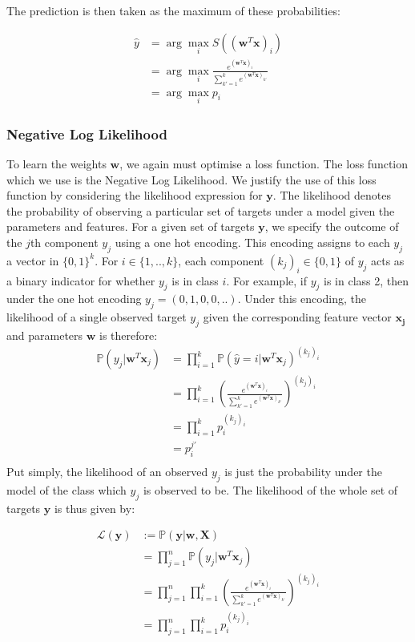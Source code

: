 The prediction is then taken as the maximum of these probabilities:

\begin{align}
   \hat{y} &= \arg \max_i S((\mathbf{w}^T\mathbf{x})_i)\\
   &= \arg\max_i \frac{e^{(\mathbf{w}^T\mathbf{x})_i}}{\sum_{k'=1}^{k} e^{(\mathbf{w}^T\mathbf{x})_{k'}}} \\
   &= \arg\max_i p_i
\end{align}

\subsubsection{Negative Log Likelihood}
To learn the weights $\mathbf{w}$, we again must optimise a loss function. The loss function which we use is the Negative Log Likelihood. We justify the use of this loss function by considering the likelihood expression for $\mathbf{y}$. The likelihood denotes the probability of observing a particular set of targets under a model given the parameters and features. For a given set of targets $\mathbf{y}$, we specify the outcome of the $j$th component $y_j$ using a one hot encoding. This encoding assigns to each $y_j$ a vector in $\{0,1\}^k$. For $i\in \{1,..,k\}$, each component $(k_j)_i \in \{0,1\}$  of $y_j$ acts as a binary indicator for whether $y_j$ is in class $i$. For example, if $y_j$ is in class 2, then under the one hot encoding $y_j = (0,1,0,0,..)$. Under this encoding, the likelihood of a single observed target $y_j$  given the corresponding feature vector $\mathbf{x_j}$ and parameters $\mathbf{w}$ is therefore:
\begin{align}
    \mathbb{P}(y_j| \mathbf{w}^T\mathbf{x}_j) &= \prod_{i=1}^{k}  \mathbb{P}(\hat{y} = i | \mathbf{w}^T\mathbf{x}_j)^{(k_j)_i} \\
    &=\prod_{i=1}^{k}  \left(\frac{e^{(\mathbf{w}^T\mathbf{x})_i}}{\sum_{k'=1}^{k} e^{(\mathbf{w}^T\mathbf{x})_{k'}}}\right)^{(k_j)_i} \\
    &=\prod_{i=1}^{k}  p_i^{(k_j)_i} \\
    &= p_i^{j'} \tag{where $j'$ is the index where $(k_j)_i = 1$} \\
\end{align}
Put simply, the likelihood of an observed $y_j$ is just the probability under the model of the class which $y_j$ is observed to be. The likelihood of the whole set of targets $\mathbf{y}$ is thus given by:

\begin{align}
\mathcal{L}(\mathbf{y}) &:=  \mathbb{P}(\mathbf{y}| \mathbf{w}, \mathbf{X}) \\
&= \prod_{j=1}^{n}\mathbb{P}(y_j| \mathbf{w}^T\mathbf{x}_j) \tag{Since the observations are independent} \\
&= \prod_{j=1}^{n}\prod_{i=1}^{k}  \left(\frac{e^{(\mathbf{w}^T\mathbf{x})_i}}{\sum_{k'=1}^{k} e^{(\mathbf{w}^T\mathbf{x})_{k'}}}\right)^{(k_j)_i} \\	
&= \prod_{j=1}^{n}\prod_{i=1}^{k}p_i^{(k_j)_i} \\	
\end{align}

